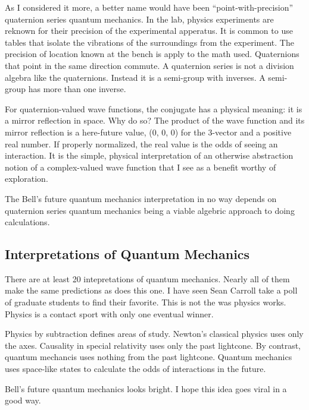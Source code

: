 As I considered it more, a better name would have been
``point-with-precision'' quaternion series quantum mechanics. In the
lab, physics experiments are reknown for their precision of the
experimental apperatus. It is common to use tables that isolate the
vibrations of the surroundings from the experiment. The precision of
location known at the bench is apply to the math used. Quaternions that
point in the same direction commute. A quaternion series is not a
division algebra like the quaternions. Instead it is a semi-group with
inverses. A semi-group has more than one inverse.

For quaternion-valued wave functions, the conjugate has a physical
meaning: it is a mirror reflection in space. Why do so? The product of
the wave function and its mirror reflection is a here-future value, (0,
0, 0) for the 3-vector and a positive real number. If properly
normalized, the real value is the odds of seeing an interaction. It is
the simple, physical interpretation of an otherwise abstraction notion
of a complex-valued wave function that I see as a benefit worthy of
exploration.

The Bell's future quantum mechanics interpretation in no way depends on
quaternion series quantum mechanics being a viable algebric approach to
doing calculations.

\hypertarget{interpretations-of-quantum-mechanics}{%
\subsection{Interpretations of Quantum
Mechanics}\label{interpretations-of-quantum-mechanics}}

There are at least 20 intepretations of quantum mechanics. Nearly all of
them make the same predictions as does this one. I have seen Sean
Carroll take a poll of graduate students to find their favorite. This is
not the was physics works. Physics is a contact sport with only one
eventual winner.

Physics by subtraction defines areas of study. Newton's classical
physics uses only the axes. Causality in special relativity uses only
the past lightcone. By contrast, quantum mechancis uses nothing from the
past lightcone. Quantum mechanics uses space-like states to calculate
the odds of interactions in the future.

Bell's future quantum mechanics looks bright. I hope this idea goes
viral in a good way.

